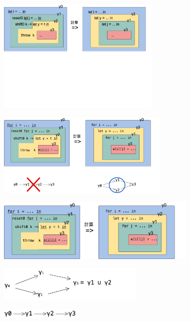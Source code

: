 \begin{center}
  \includegraphics[clip,height=5.5cm]{./img/ecex_let_non_gamma.png}
\end{center}

\begin{center}
  \includegraphics[clip,height=4cm]{./img/ecex_for.png}
\end{center}

\begin{center}
  \includegraphics[clip,height=3cm]{./img/ecex_for_non_gamma.png}
\end{center}

\begin{center}
  \includegraphics[clip,width=7cm]{./img/gamma.png}
\end{center}

\begin{center}
  \includegraphics[clip,width=4cm]{./img/gamma_normal.png}
\end{center}

